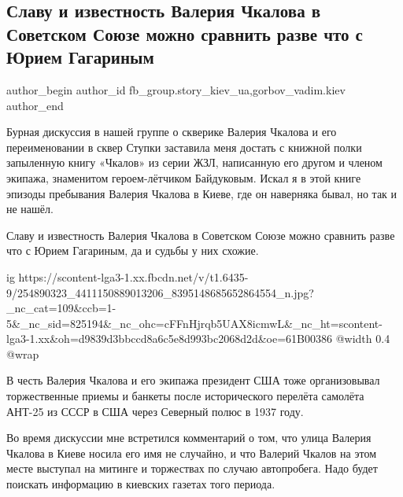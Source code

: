  
 
 
 
 
 
\subsection{Славу и известность  Валерия Чкалова в Советском Союзе  можно сравнить разве что с Юрием Гагариным}
\label{sec:10_11_2021.fb.fb_group.story_kiev_ua.1.chkalov_skver_kiev}
 
\ifcmt
 author_begin
   author_id fb_group.story_kiev_ua,gorbov_vadim.kiev
 author_end
\fi

Бурная дискуссия в  нашей группе  о скверике Валерия Чкалова и его
переименовании в сквер Ступки заставила меня достать с книжной полки запыленную
книгу «Чкалов» из серии ЖЗЛ, написанную его другом и членом экипажа, знаменитом
героем-лётчиком Байдуковым. Искал я в этой книге эпизоды пребывания  Валерия
Чкалова в Киеве, где он наверняка бывал, но так и не нашёл. 

Славу и известность  Валерия Чкалова в Советском Союзе  можно сравнить разве
что с Юрием Гагариным, да и судьбы у них схожие. 

\ifcmt
  ig https://scontent-lga3-1.xx.fbcdn.net/v/t1.6435-9/254890323_4411150889013206_8395148685652864554_n.jpg?_nc_cat=109&ccb=1-5&_nc_sid=825194&_nc_ohc=cFFnHjrqb5UAX8icmwL&_nc_ht=scontent-lga3-1.xx&oh=d9839d3bbccd8a6c5e8d993bc2068d2d&oe=61B00386
  @width 0.4
  @wrap 
\fi

В честь Валерия Чкалова и его экипажа президент США тоже организовывал
торжественные приемы и банкеты после исторического перелёта самолёта АНТ-25 из
СССР в США через Северный полюс в 1937 году. 

Во время дискуссии мне встретился комментарий о том, что улица Валерия Чкалова
в Киеве носила его имя не случайно, и что Валерий Чкалов на этом месте выступал
на митинге и торжествах по случаю автопробега. Надо будет поискать информацию
в киевских газетах того периода. 

